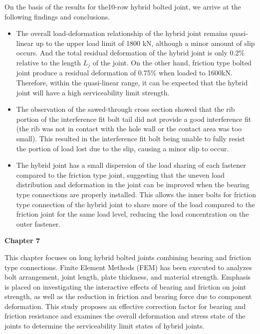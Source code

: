 On the basis of the results for the10-row hybrid bolted joint, we arrive at the following findings and conclusions.

\begin{itemize}

\item The overall load-deformation relationship of the hybrid joint remains quasi-linear up to the upper load limit of 1800 kN, although a minor amount of slip occurs. And the total residual deformation of the hybrid joint is only 0.2\% relative to the length $L_j$ of the joint. On the other hand, friction type bolted joint produce a residual deformation of 0.75\% when loaded to 1600kN. Therefore, within the quasi-linear range, it can be expected that the hybrid joint will have a high serviceability limit strength.

\item The observation of the sawed-through cross section showed that the rib portion of the interference fit bolt tail did not provide a good interference fit (the rib was not in contact with the hole wall or the contact area was too small). This resulted in the interference fit bolt being unable to fully resist the portion of load lost due to the slip, causing a minor slip to occur. 

\item The hybrid joint has a small dispersion of the load sharing of each fastener compared to the friction type joint, suggesting that the uneven load distribution and deformation in the joint can be improved when the bearing type connections are properly installed. This allows the inner bolts for friction type connection of the hybrid joint to share more of the load compared to the friction joint for the same load level, reducing the load concentration on the outer fastener.


\end{itemize}



\textbf{Chapter 7}

This chapter focuses on long hybrid bolted joints combining bearing and friction type connections. Finite Element Methods (FEM) has been executed to analyzes bolt arrangement, joint length, plate thickness, and material strength. Emphasis is placed on investigating the interactive effects of bearing and friction on joint strength, as well as the reduction in friction and bearing force due to component deformation. This study proposes an effective correction factor for bearing and friction resistance and examines the overall deformation and stress state of the joints to determine the serviceability limit states of hybrid joints.

